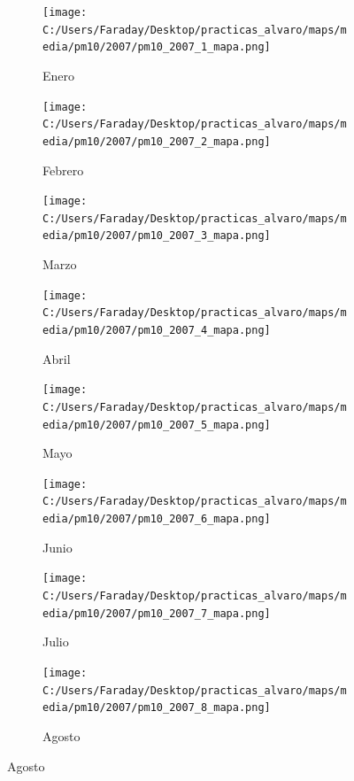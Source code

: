 \documentclass[12pt]{beamer}
\begin{document}
\begin{frame}[squeeze]
\tiny
\begin{figure}[H]
\centering
\begin{subfigure}[H]{0.20\textwidth}
\texttt{[image: C:/Users/Faraday/Desktop/practicas\_alvaro/maps/media/pm10/2007/pm10\_2007\_1\_mapa.png]}
\captionsetup{labelformat=empty}
\caption{\scriptsize Enero}
\label{fig:map-pm10-2007-1}
\end{subfigure}
%
\begin{subfigure}[H]{0.20\textwidth}
\texttt{[image: C:/Users/Faraday/Desktop/practicas\_alvaro/maps/media/pm10/2007/pm10\_2007\_2\_mapa.png]}
\captionsetup{labelformat=empty}
\caption{\scriptsize Febrero}
\label{fig:map-pm10-2007-2}
\end{subfigure}
%
\begin{subfigure}[H]{0.20\textwidth}
\texttt{[image: C:/Users/Faraday/Desktop/practicas\_alvaro/maps/media/pm10/2007/pm10\_2007\_3\_mapa.png]}
\captionsetup{labelformat=empty}
\caption{\scriptsize Marzo}
\label{fig:map-pm10-2007-3}
\end{subfigure}
%
\begin{subfigure}[H]{0.20\textwidth}
\texttt{[image: C:/Users/Faraday/Desktop/practicas\_alvaro/maps/media/pm10/2007/pm10\_2007\_4\_mapa.png]}
\captionsetup{labelformat=empty}
\caption{\scriptsize Abril}
\label{fig:map-pm10-2007-4}
\end{subfigure}

\begin{subfigure}[H]{0.20\textwidth}
\texttt{[image: C:/Users/Faraday/Desktop/practicas\_alvaro/maps/media/pm10/2007/pm10\_2007\_5\_mapa.png]}
\captionsetup{labelformat=empty}
\caption{\scriptsize Mayo}
\label{fig:map-pm10-2007-5}
\end{subfigure}
%
\begin{subfigure}[H]{0.20\textwidth}
\texttt{[image: C:/Users/Faraday/Desktop/practicas\_alvaro/maps/media/pm10/2007/pm10\_2007\_6\_mapa.png]}
\captionsetup{labelformat=empty}
\caption{\scriptsize Junio}
\label{fig:map-pm10-2007-6}
\end{subfigure}
%
\begin{subfigure}[H]{0.20\textwidth}
\texttt{[image: C:/Users/Faraday/Desktop/practicas\_alvaro/maps/media/pm10/2007/pm10\_2007\_7\_mapa.png]}
\captionsetup{labelformat=empty}
\caption{\scriptsize Julio}
\label{fig:map-pm10-2007-7}
\end{subfigure}
%
\begin{subfigure}[H]{0.20\textwidth}
\texttt{[image: C:/Users/Faraday/Desktop/practicas\_alvaro/maps/media/pm10/2007/pm10\_2007\_8\_mapa.png]}
\captionsetup{labelformat=empty}
\caption{\scriptsize Agosto}
\label{fig:map-pm10-2007-8}
\end{subfigure}


\end{figure}
\end{frame}
\end{document}

